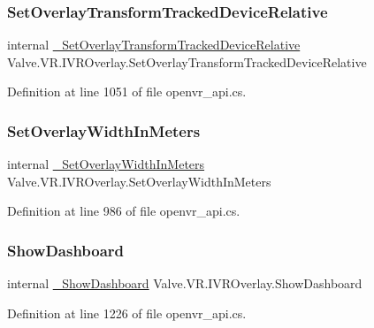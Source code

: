 \subsubsection{\texorpdfstring{SetOverlayTransformTrackedDeviceRelative}{SetOverlayTransformTrackedDeviceRelative}}
{\footnotesize\ttfamily internal \mbox{\hyperlink{struct_valve_1_1_v_r_1_1_i_v_r_overlay_ac83c23b8afe439475d80d3e64db9878d}{\+\_\+\+Set\+Overlay\+Transform\+Tracked\+Device\+Relative}} Valve.\+V\+R.\+I\+V\+R\+Overlay.\+Set\+Overlay\+Transform\+Tracked\+Device\+Relative}



Definition at line 1051 of file openvr\+\_\+api.\+cs.

\mbox{\label{struct_valve_1_1_v_r_1_1_i_v_r_overlay_a50e184f773489734a9c84c47e8f03ae1}} 
\subsubsection{\texorpdfstring{SetOverlayWidthInMeters}{SetOverlayWidthInMeters}}
{\footnotesize\ttfamily internal \mbox{\hyperlink{struct_valve_1_1_v_r_1_1_i_v_r_overlay_ae65d9b762f6024173ed7f2362e7755ce}{\+\_\+\+Set\+Overlay\+Width\+In\+Meters}} Valve.\+V\+R.\+I\+V\+R\+Overlay.\+Set\+Overlay\+Width\+In\+Meters}



Definition at line 986 of file openvr\+\_\+api.\+cs.

\mbox{\label{struct_valve_1_1_v_r_1_1_i_v_r_overlay_a448d09ab757b70b664a7447339e8a641}} 
\subsubsection{\texorpdfstring{ShowDashboard}{ShowDashboard}}
{\footnotesize\ttfamily internal \mbox{\hyperlink{struct_valve_1_1_v_r_1_1_i_v_r_overlay_ab4a713cf43946bbc014316ba20c21a3e}{\+\_\+\+Show\+Dashboard}} Valve.\+V\+R.\+I\+V\+R\+Overlay.\+Show\+Dashboard}



Definition at line 1226 of file openvr\+\_\+api.\+cs.


